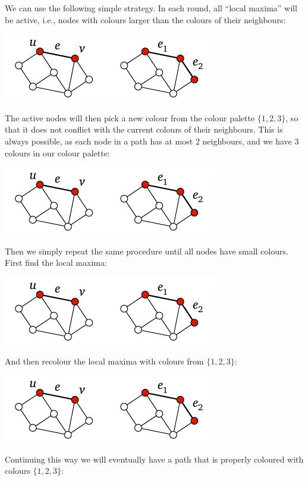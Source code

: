 We can use the following simple strategy. In each round, all ``local maxima'' will be active, i.e., nodes with colours larger than the colours of their neighbours:
\begin{center}
    \includegraphics[page=\PIntroIdA]{figs.pdf}
\end{center}
The active nodes will then pick a new colour from the colour palette $\{1,2,3\}$, so that it does not conflict with the current colours of their neighbours. This is always possible, as each node in a path has at most $2$ neighbours, and we have $3$ colours in our colour palette:
\begin{center}
    \includegraphics[page=\PIntroIdAA]{figs.pdf}
\end{center}
Then we simply repeat the same procedure until all nodes have small colours. First find the local maxima:
\begin{center}
    \includegraphics[page=\PIntroIdB]{figs.pdf}
\end{center}
And then recolour the local maxima with colours from $\{1,2,3\}$:
\begin{center}
    \includegraphics[page=\PIntroIdBB]{figs.pdf}
\end{center}
Continuing this way we will eventually have a path that is properly coloured with colours $\{1,2,3\}$:

